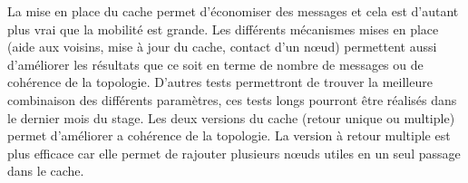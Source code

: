 La mise en place du cache permet d'économiser des messages et cela est d'autant plus vrai que la mobilité est grande. Les différents mécanismes mises en place (aide aux voisins, mise à jour du cache, contact d'un nœud) permettent aussi d'améliorer les résultats que ce soit en terme de nombre de messages ou de cohérence de la topologie. D'autres tests permettront de trouver la meilleure combinaison des différents paramètres, ces tests longs pourront être réalisés dans le dernier mois du stage. Les deux versions du cache (retour unique ou multiple) permet d'améliorer a cohérence de la topologie. La version à retour multiple est plus efficace car elle permet de rajouter plusieurs nœuds utiles en un seul passage dans le cache.
 
